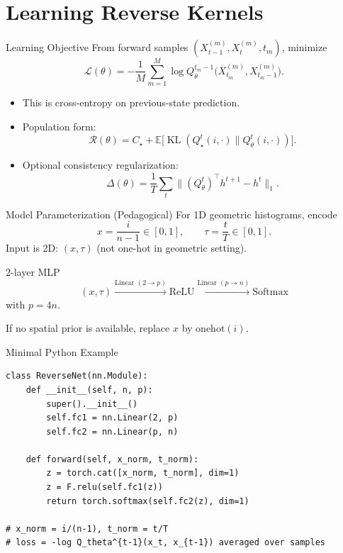 \documentclass[aspectratio=169,11pt]{beamer}
\newcommand{\KL}{\operatorname{KL}}
\begin{document}
\section{Learning Reverse Kernels}

\begin{frame}{Learning Objective}
From forward samples $(X_{t-1}^{(m)},X_t^{(m)},t_m)$, minimize
\[
\mathcal L(\theta)
=-\frac1M\sum_{m=1}^M
\log Q_\theta^{t_m-1}\big(X_{t_m}^{(m)},X_{t_m-1}^{(m)}\big).
\]

\begin{itemize}
\item This is cross-entropy on previous-state prediction.
\item Population form:
\[
\mathcal R(\theta)=C_\star+\mathbb E\big[\KL(Q_\star^t(i,\cdot)\|Q_\theta^t(i,\cdot))\big].
\]
\item Optional consistency regularization:
\[
\Delta(\theta)=\frac1T\sum_t\|(Q_\theta^t)^\top h^{t+1}-h^t\|_1.
\]
\end{itemize}
\end{frame}

\begin{frame}{Model Parameterization (Pedagogical)}
For 1D geometric histograms, encode
\[
x=\frac{i}{n-1}\in[0,1],\qquad \tau=\frac{t}{T}\in[0,1].
\]
Input is 2D: $(x,\tau)$ (not one-hot in geometric setting).

\begin{block}{2-layer MLP}
\[
(x,\tau)\xrightarrow{\text{Linear }(2\to p)}\mathrm{ReLU}\xrightarrow{\text{Linear }(p\to n)}\mathrm{Softmax}
\]
with $p=4n$.
\end{block}

If no spatial prior is available, replace $x$ by $\mathrm{onehot}(i)$.
\end{frame}

\begin{frame}[fragile]{Minimal Python Example}
\begin{lstlisting}[style=py]
class ReverseNet(nn.Module):
    def __init__(self, n, p):
        super().__init__()
        self.fc1 = nn.Linear(2, p)
        self.fc2 = nn.Linear(p, n)

    def forward(self, x_norm, t_norm):
        z = torch.cat([x_norm, t_norm], dim=1)
        z = F.relu(self.fc1(z))
        return torch.softmax(self.fc2(z), dim=1)

# x_norm = i/(n-1), t_norm = t/T
# loss = -log Q_theta^{t-1}(x_t, x_{t-1}) averaged over samples
\end{lstlisting}
\end{frame}
\end{document}
